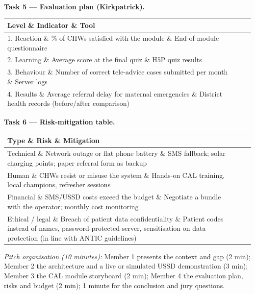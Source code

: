 \documentclass[11pt]{article}
\begin{document}
\textbf{Task 5 — Evaluation plan (Kirkpatrick).}

\begin{center}
\begin{tabularx}{\linewidth}{|l|X|X|}
\hline
\rowcolor{popblueL} \textbf{Level} \& \textbf{Indicator} \& \textbf{Tool} \\
\hline
1. Reaction \& \% of CHWs satisfied with the module \& End-of-module questionnaire \\
\hline
2. Learning \& Average score at the final quiz \& H5P quiz results \\
\hline
3. Behaviour \& Number of correct tele-advice cases submitted per month \& Server logs \\
\hline
4. Results \& Average referral delay for maternal emergencies \& District health records (before/after comparison) \\
\hline
\end{tabularx}
\end{center}

\textbf{Task 6 — Risk-mitigation table.}

\begin{center}
\begin{tabularx}{\linewidth}{|l|X|X|}
\hline
\rowcolor{popblueL} \textbf{Type} \& \textbf{Risk} \& \textbf{Mitigation} \\
\hline
Technical \& Network outage or flat phone battery \& SMS fallback; solar charging points; paper referral form as backup \\
\hline
Human \& CHWs resist or misuse the system \& Hands-on CAL training, local champions, refresher sessions \\
\hline
Financial \& SMS/USSD costs exceed the budget \& Negotiate a bundle with the operator; monthly cost monitoring \\
\hline
Ethical / legal \& Breach of patient data confidentiality \& Patient codes instead of names, password-protected server, sensitisation on data protection (in line with ANTIC guidelines) \\
\hline
\end{tabularx}
\end{center}

\emph{Pitch organisation (10 minutes):} Member 1 presents the context and gap (2 min); Member 2 the architecture and a live or simulated USSD demonstration (3 min); Member 3 the CAL module storyboard (2 min); Member 4 the evaluation plan, risks and budget (2 min); 1 minute for the conclusion and jury questions.
\end{document}
